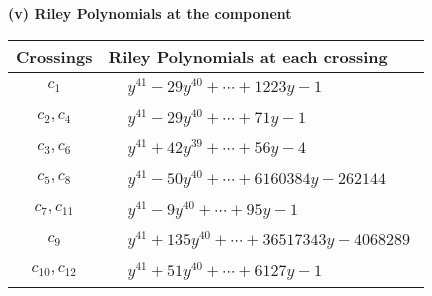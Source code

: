 \documentclass[1p]{elsarticle_modified}
\theoremstyle{definition}
\begin{document}
\newpage\renewcommand{\arraystretch}{1}
\flushleft \textbf{(v) Riley Polynomials at the component}\newline \\
\begin{tabular}{m{50pt}|m{274pt}}
Crossings & \hspace{64pt}Riley Polynomials at each crossing \\
\hline $$\begin{aligned}c_{1}\end{aligned}$$&$\begin{aligned}
&y^{41}-29 y^{40}+\cdots+1223 y-1
\end{aligned}$\\
\hline $$\begin{aligned}c_{2},c_{4}\end{aligned}$$&$\begin{aligned}
&y^{41}-29 y^{40}+\cdots+71 y-1
\end{aligned}$\\
\hline $$\begin{aligned}c_{3},c_{6}\end{aligned}$$&$\begin{aligned}
&y^{41}+42 y^{39}+\cdots+56 y-4
\end{aligned}$\\
\hline $$\begin{aligned}c_{5},c_{8}\end{aligned}$$&$\begin{aligned}
&y^{41}-50 y^{40}+\cdots+6160384 y-262144
\end{aligned}$\\
\hline $$\begin{aligned}c_{7},c_{11}\end{aligned}$$&$\begin{aligned}
&y^{41}-9 y^{40}+\cdots+95 y-1
\end{aligned}$\\
\hline $$\begin{aligned}c_{9}\end{aligned}$$&$\begin{aligned}
&y^{41}+135 y^{40}+\cdots+36517343 y-4068289
\end{aligned}$\\
\hline $$\begin{aligned}c_{10},c_{12}\end{aligned}$$&$\begin{aligned}
&y^{41}+51 y^{40}+\cdots+6127 y-1
\end{aligned}$\\
\hline
\end{tabular}\\~\\
\end{document}
